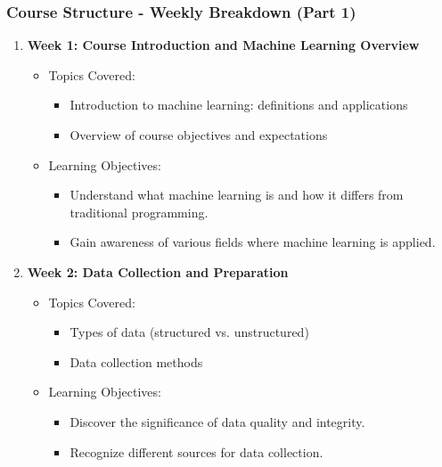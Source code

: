 \documentclass[aspectratio=169]{beamer}
\begin{document}
\begin{frame}[fragile]
  \frametitle{Course Structure - Weekly Breakdown (Part 1)}
  \begin{enumerate}
    \item \textbf{Week 1: Course Introduction and Machine Learning Overview}
      \begin{itemize}
        \item Topics Covered:
        \begin{itemize}
          \item Introduction to machine learning: definitions and applications
          \item Overview of course objectives and expectations
        \end{itemize}
        \item Learning Objectives:
        \begin{itemize}
          \item Understand what machine learning is and how it differs from traditional programming.
          \item Gain awareness of various fields where machine learning is applied.
        \end{itemize}
      \end{itemize}
    
    \item \textbf{Week 2: Data Collection and Preparation}
      \begin{itemize}
        \item Topics Covered:
        \begin{itemize}
          \item Types of data (structured vs. unstructured)
          \item Data collection methods
        \end{itemize}
        \item Learning Objectives:
        \begin{itemize}
          \item Discover the significance of data quality and integrity.
          \item Recognize different sources for data collection.
        \end{itemize}
      \end{itemize}
    

\end{enumerate}
\end{frame}
\end{document}
